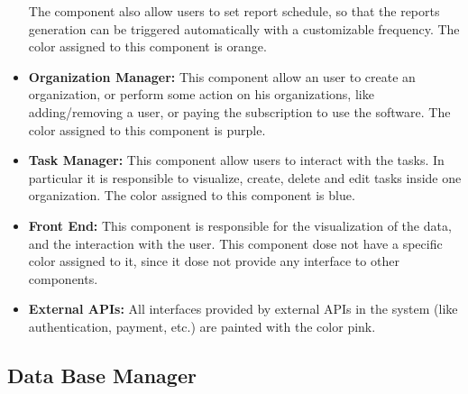 \documentclass{article}
\begin{document}
\begin{itemize}
          The component also allow users to set report schedule, so that the reports generation can be triggered automatically with a customizable frequency.
          The color assigned to this component is \textcolor[HTML]{FA9646}{orange}.
    \item \textcolor[HTML]{FF00FF}{\textbf{Organization Manager: }} This component allow an user to create an organization, or perform some action on his organizations,
          like adding/removing a user, or paying the subscription to use the software. The color assigned to this component is \textcolor[HTML]{FF00FF}{purple}.
    \item \textcolor[HTML]{2682D5}{\textbf{Task Manager: }} This component allow users to interact with the tasks.
          In particular it is responsible to visualize, create, delete and edit tasks inside one organization. The color assigned to this component is \textcolor[HTML]{2682D5}{blue}.
    \item \textbf{Front End: } This component is responsible for the visualization of the data, and the interaction with the user. This component dose not have a specific color assigned to it, since it dose not provide any interface to other components.
    \item \textcolor[HTML]{E68CB4}{\textbf{External APIs: }} All interfaces provided by external APIs in the system (like authentication, payment, etc.) are painted with the color \textcolor[HTML]{E68CB4}{pink}.
\end{itemize}

\subsection{Data Base Manager}
\end{document}
